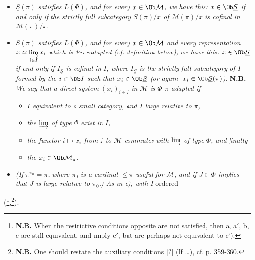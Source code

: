 \begin{itemize}[leftmargin=2.5em]
\item[b)] \textit{$\underline{S}(\pi)$ satisfies $L(\Phi)$, and for every $x\in\Ob\mathcal{M}$, we have this: $x\in\Ob\underline{S}$ if and only if the strictly full subcategory $\underline{S}(\pi)/x$ of $\mathcal{M}(\pi)/x$ is cofinal in $\mathcal{M}(\pi)/x$}.
\item[\cercle{c}] \textit{$\underline{S}(\pi)$ satisfies $L(\Phi)$, and for every $x\in\Ob\mathcal{M}$ and every representation $x\simeq\varinjlim\limits_{i\in I}x_i$ which is $\Phi$-$\pi$-adapted (cf. definition below), we have this: $x\in\Ob\underline{S}$ if and only if $I_{\underline{S}}$ is cofinal in $I$, where $I_{\underline{S}}$ is the strictly full subcategory of $I$ formed by the $i\in\Ob I$ such that $x_i\in\Ob\underline{S}$ (or again, $x_i\in\Ob\underline{S}(\pi)$).} \textbf{N.B.} \textit{We say that a direct system $(x_i)_{i\in I}$ in $\mathcal{M}$ is $\Phi$-$\pi$-adapted if}
\begin{itemize}[leftmargin=2em]
\item[\textit{1)}] \textit{$I$ equivalent to a small category, and $I$ large relative to $\pi$,}
\item[\textit{2)}] \textit{the $\varinjlim$ of type $\Phi$ exist in $I$,}
\item[\textit{3)}] \textit{the functor $i\longmapsto x_i$ from $I$ to $\mathcal{M}$ commutes with $\varinjlim$ of type $\Phi$, and finally}
\item[\textit{4)}] \textit{the $x_i\in\Ob\mathcal{M}_\pi$.}
\end{itemize}
\item[c$'$)] \textit{(If $\pi^{\pi_0}=\pi$, where $\pi_0$ is a cardinal $\leqslant\pi$ useful for $\mathcal{M}$, and if $J\in\Phi$ implies that $J$ is large relative to $\pi_0$.) As in c), with $I$} ordered.
\end{itemize}
(\footnote{\textbf{N.B.} When the restrictive conditions opposite are not satisfied, then a, a$'$, b, c are still equivalent, and imply c$'$, but are perhaps not equivalent to c$'$).},\footnote{\textbf{N.B.} One should restate the auxiliary conditions [?] (If \dots), cf. p. 359-360.}).

